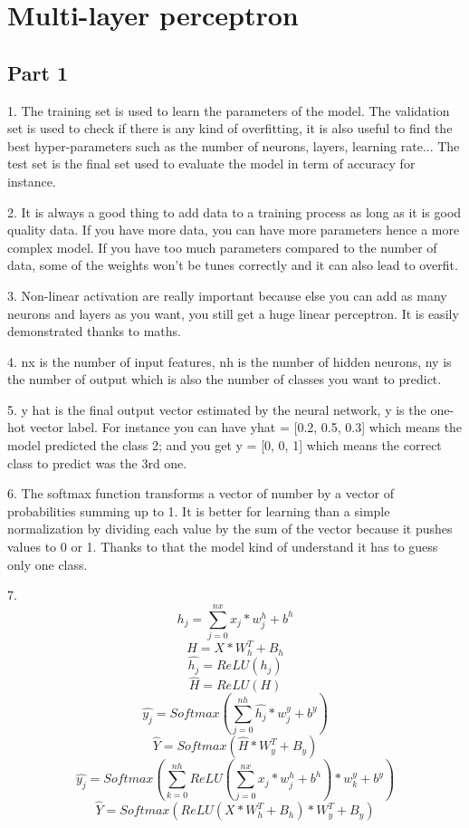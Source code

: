 \section{Multi-layer perceptron}

\subsection{Part 1}

1. The training set is used to learn the parameters of the model. The validation set is used to check if there is any kind of overfitting, it is also useful to find the best hyper-parameters such as the number of neurons, layers, learning rate... The test set is the final set used to evaluate the model in term of accuracy for instance.

2. It is always a good thing to add data to a training process as long as it is good quality data. If you have more data, you can have more parameters hence a more complex model. If you have too much parameters compared to the number of data, some of the weights won't be tunes correctly and it can also lead to overfit.

3. Non-linear activation are really important because else you can add as many neurons and layers as you want, you still get a huge linear perceptron. It is easily demonstrated thanks to maths.

4. nx is the number of input features, nh is the number of hidden neurons, ny is the number of output which is also the number of classes you want to predict.

5. y hat is the final output vector estimated by the neural network, y is the one-hot vector label. For instance you can have yhat = [0.2, 0.5, 0.3] which means the model predicted the class 2; and you get y = [0, 0, 1] which means the correct class to predict was the 3rd one.

6. The softmax function transforms a vector of number by a vector of probabilities summing up to 1. It is better for learning than a simple normalization by dividing each value by the sum of the vector because it pushes values to 0 or 1. Thanks to that the model kind of understand it has to guess only one class.

7. 
\[
    h_{j} = \sum_{j=0}^{nx} x_{j} * w_{j}^h + b^h
\]
\[
    H = X * W_{h}^T + B_{h}
\]
\[
    \hat{h_{j}} = ReLU(h_{j})
\]
\[
    \hat{H} = ReLU(H)
\]
\[
    \hat{y_{j}} = Softmax(\sum_{j=0}^{nh} \hat{h_{j}} * w_{j}^y + b^y)
\]
\[
    \hat{Y} = Softmax(\hat{H} * W_{y}^T + B_{y}) 
\]
\[
    \hat{y_{j}} = Softmax(\sum_{k=0}^{nh} ReLU(\sum_{j=0}^{nx} x_{j} * w_{j}^h + b^h) * w_{k}^y + b^y)
\]
\[
    \hat{Y} = Softmax(ReLU(X * W_{h}^T + B_{h}) * W_{y}^T + B_{y})
\]

